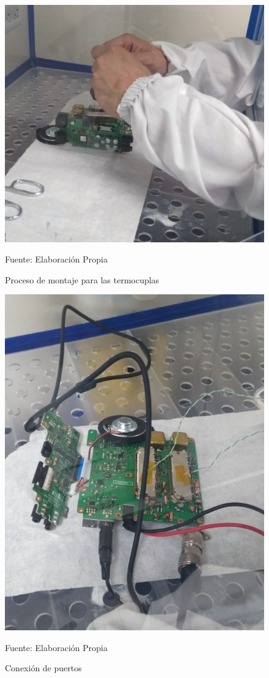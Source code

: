 \begin{figure}[H]
\centering
\includegraphics[scale=0.5]{Figuras/Montaje_4.jpeg}
\caption{Proceso de montaje para las termocuplas}
Fuente: Elaboración Propia
\label{anexo14}
\end{figure}

\begin{figure}[H]
\centering
\includegraphics[scale=0.5]{Figuras/Montaje_6.jpeg}
\caption{Conexión de puertos}
Fuente: Elaboración Propia
\label{anexo15}
\end{figure}